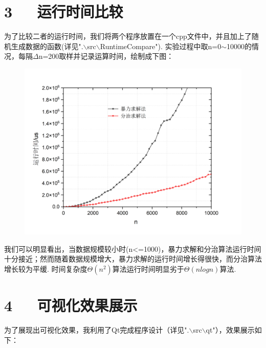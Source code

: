 \documentclass[UTF8]{ctexart}
\begin{document}
\section*{3\ \ \ 运行时间比较}
为了比较二者的运行时间，我们将两个程序放置在一个cpp文件中，并且加上了随机生成数据的函数(详见".$\backslash$src$\backslash$RuntimeCompare"). 实验过程中取n=0$\sim$10000的情况，每隔$\Delta$n=200取样并记录运算时间，绘制成下图：
\begin{figure}[H]\begin{center}
	\includegraphics[scale = 0.5]{graph3.png}
\end{center}\end{figure}\par

我们可以明显看出，当数据规模较小时(n<=1000)，暴力求解和分治算法运行时间十分接近；然而随着数据规模增大，暴力求解的运行时间增长得很快，而分治算法增长较为平缓. 时间复杂度$\Theta(n^2)$算法运行时间明显劣于$\Theta(nlogn)$算法.

\section*{4\ \ \ 可视化效果展示}
为了展现出可视化效果，我利用了Qt完成程序设计（详见".$\backslash$src$\backslash$qt"），效果展示如下：
\end{document}
